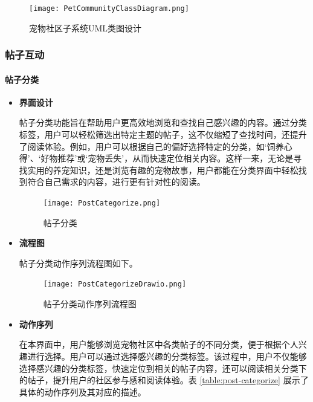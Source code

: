 \begin{figure}[H]
	\centering
	\texttt{[image: PetCommunityClassDiagram.png]}
	\caption{宠物社区子系统UML类图设计}
\end{figure}

\subsubsection{帖子互动}

\paragraph{帖子分类}

\begin{itemize}
	\item \textbf{界面设计}
	
	帖子分类功能旨在帮助用户更高效地浏览和查找自己感兴趣的内容。通过分类标签，用户可以轻松筛选出特定主题的帖子，这不仅缩短了查找时间，还提升了阅读体验。例如，用户可以根据自己的偏好选择特定的分类，如‘饲养心得’、‘好物推荐’或‘宠物丢失’，从而快速定位相关内容。这样一来，无论是寻找实用的养宠知识，还是浏览有趣的宠物故事，用户都能在分类界面中轻松找到符合自己需求的内容，进行更有针对性的阅读。
	
	\begin{figure}[H]
		\centering
		\texttt{[image: PostCategorize.png]} 
		\caption{帖子分类}
		\label{fig:post-categorize}
	\end{figure}
	
	
	\item \textbf{流程图}
	
	帖子分类动作序列流程图如下。
	
	\begin{figure}[H]
		\centering
		\texttt{[image: PostCategorizeDrawio.png]} 
		\caption{帖子分类动作序列流程图}
		\label{fig:post-categorize.drawio}
	\end{figure}
	
	\item \textbf{动作序列}
	
	在本界面中，用户能够浏览宠物社区中各类帖子的不同分类，便于根据个人兴趣进行选择。用户可以通过选择感兴趣的分类标签。该过程中，用户不仅能够选择感兴趣的分类标签，快速定位到相关的帖子内容，还可以阅读相关分类下的帖子，提升用户的社区参与感和阅读体验。表 \ref{table:post-categorize} 展示了具体的动作序列及其对应的描述。
	

\end{itemize}

